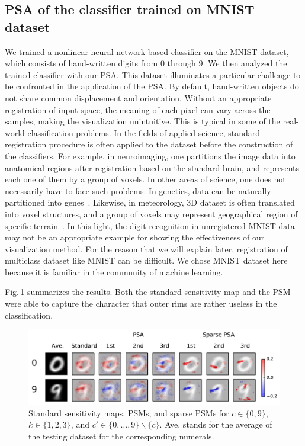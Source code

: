 \subsection{PSA of the classifier trained on MNIST dataset}
We trained a nonlinear neural network-based classifier on the MNIST
dataset, which consists of hand-written digits from $0$ through $9$.
%
We then analyzed the trained classifier with our PSA.
%
This dataset illuminates a particular challenge to be confronted in the application of the PSA.
%
By default, hand-written objects do not share common displacement and orientation.
%
Without an appropriate registration of input space,
the meaning of each pixel can vary across the samples, making the
visualization unintuitive.
%
This is typical in some of the real-world classification problems.
%
In the fields of applied science, standard registration procedure is
often applied to the dataset before the construction of the classifiers.
%
For example, in neuroimaging, one partitions the image data into anatomical
regions after registration based on the standard brain,
and represents each one of them by a group of voxels.
%
In other areas of science, one does not necessarily have to face such problems.
%
In genetics, data can be naturally partitioned into genes~\cite{Yukinawa2009}.
%
Likewise, in meteorology, 3D dataset is often translated into voxel
structures, and a group of voxels may represent geographical region of
specific terrain~\cite{Kontos2005}.
%
In this light, the digit recognition in unregistered MNIST data may not
be an appropriate example for showing the effectiveness of our visualization method.
For the reason that we will explain later, registration of multiclass
dataset like MNIST can be difficult.
%
We chose MNIST dataset here because it is familiar in the community of
machine learning.

Fig.\,\ref{fig:psms_mnist} summarizes the results.
%
Both the standard sensitivity map and the PSM were able to
capture the character that outer rims are rather useless in the classification.
\begin{figure}[htb]
 \centering
 \includegraphics[width=0.8\columnwidth]{./fig/fig5a.pdf}
 \caption{Standard sensitivity maps, PSMs, and sparse PSMs for
 $c \in \{0, 9\}$, $k \in \{1, 2, 3\}$, and $c' \in \{0, \dots
 ,9\} \backslash \{c\}$.
 Ave. stands for the average of the testing dataset for the corresponding numerals.}
 \label{fig:psms_mnist}
\end{figure}

